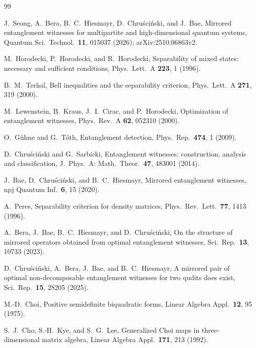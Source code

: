 \documentclass[11pt,a4paper]{article}
\theoremstyle{remark}
\begin{document}
\begin{thebibliography}{99}

 J.~Seong, A.~Bera, B.~C.~Hiesmayr, D.~Chru\'sci\'nski, and J.~Bae,
Mirrored entanglement witnesses for multipartite and high-dimensional quantum systems,
Quantum Sci.\ Technol.\ \textbf{11}, 015037 (2026); arXiv:2510.06863v2.

 M.~Horodecki, P.~Horodecki, and R.~Horodecki,
Separability of mixed states: necessary and sufficient conditions,
Phys.\ Lett.\ A \textbf{223}, 1 (1996).

 B.~M.~Terhal, Bell inequalities and the separability criterion,
Phys.\ Lett.\ A \textbf{271}, 319 (2000).

 M.~Lewenstein, B.~Kraus, J.~I.~Cirac, and P.~Horodecki,
Optimization of entanglement witnesses, Phys.\ Rev.\ A \textbf{62}, 052310 (2000).

 O.~G\"uhne and G.~T\'oth, Entanglement detection,
Phys.\ Rep.\ \textbf{474}, 1 (2009).

 D.~Chru\'sci\'nski and G.~Sarbicki,
Entanglement witnesses: construction, analysis and classification,
J.\ Phys.\ A: Math.\ Theor.\ \textbf{47}, 483001 (2014).

 J.~Bae, D.~Chru\'sci\'nski, and B.~C.~Hiesmayr,
Mirrored entanglement witnesses, npj Quantum Inf.\ \textbf{6}, 15 (2020).

 A.~Peres, Separability criterion for density matrices,
Phys.\ Rev.\ Lett.\ \textbf{77}, 1413 (1996).

 A.~Bera, J.~Bae, B.~C.~Hiesmayr, and D.~Chru\'sci\'nski,
On the structure of mirrored operators obtained from optimal entanglement witnesses,
Sci.\ Rep.\ \textbf{13}, 10733 (2023).

 D.~Chru\'sci\'nski, A.~Bera, J.~Bae, and B.~C.~Hiesmayr,
A mirrored pair of optimal non-decomposable entanglement witnesses for two qudits does
exist, Sci.\ Rep.\ \textbf{15}, 28205 (2025).

 M.-D.~Choi, Positive semidefinite biquadratic forms,
Linear Algebra Appl.\ \textbf{12}, 95 (1975).

 S.~J.~Cho, S.-H.~Kye, and S.~G.~Lee,
Generalized Choi maps in three-dimensional matrix algebra,
Linear Algebra Appl.\ \textbf{171}, 213 (1992).

\end{thebibliography}
\end{document}
